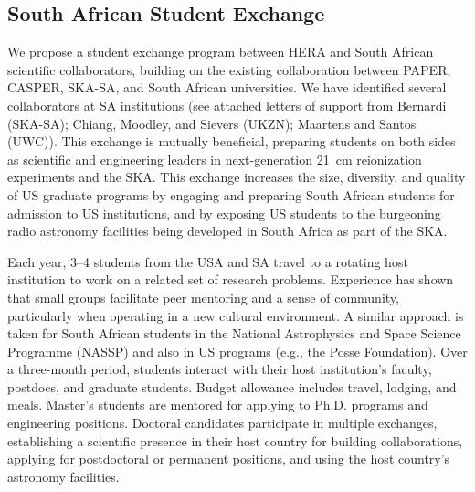 \documentclass[preprint]{aastex}
\newcommand{\compress}{\vspace{-0.25in}}
\begin{document}
\compress
\subsection{South African Student Exchange}

We propose 
a student exchange program
between HERA and South African scientific collaborators,
building on the existing
collaboration between PAPER, CASPER, SKA-SA, and South African universities.
We have identified several collaborators at SA institutions (see attached
letters of support from Bernardi (SKA-SA); Chiang, Moodley, and 
Sievers (UKZN); Maartens and Santos (UWC)).  This exchange is mutually beneficial,
preparing students on both sides as scientific and engineering leaders
in next-generation 21~cm
reionization experiments and the SKA.  This
exchange increases the size, diversity, and quality of US graduate programs by
engaging and preparing South African students for admission to US institutions,
and by exposing US students to the burgeoning radio astronomy facilities being
developed in South Africa as part of the SKA. %

Each year,
3--4 students from the USA and SA 
travel to a rotating host institution to work on a related set of
research problems.  
Experience has shown that small groups facilitate peer mentoring and
a sense of community, particularly when operating in a new cultural
environment.  A similar approach is taken for South African students
in the National Astrophysics and Space Science Programme (NASSP)
and also in US programs (e.g., the Posse Foundation).
Over a three-month period,
students interact with their host institution's
faculty, postdocs, and graduate students.  Budget
allowance includes travel, lodging, and meals.  Master's students 
are mentored for applying to Ph.D. programs and engineering positions.  Doctoral
candidates participate in multiple exchanges, 
establishing a scientific presence in their host country for
building collaborations, applying for postdoctoral or permanent
positions, and using the host
country's astronomy facilities.  %
\end{document}
